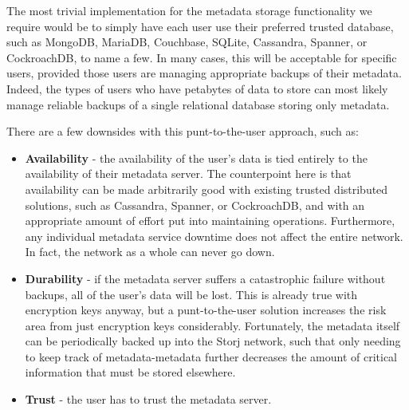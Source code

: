 \documentclass[11pt,fleqn,openany]{book}
\begin{document}
The most trivial implementation for the metadata storage functionality we
require would be to simply have each user use their preferred trusted database,
such as MongoDB, MariaDB, Couchbase, SQLite, Cassandra\cite{cassandra},
Spanner\cite{spanner}, or CockroachDB, to name a few. In many cases, this will
be acceptable for specific users, provided those users are managing appropriate
backups of their metadata. Indeed, the types of users who have petabytes of data
to store can most likely manage reliable backups of a single relational database
storing only metadata.

There are a few downsides with this punt-to-the-user approach, such as:
\begin{itemize}
\item {\bf Availability} - the availability of the user's data
is tied entirely to the availability of their metadata server. The counterpoint
here is that availability can be made arbitrarily good with existing trusted
distributed solutions, such as Cassandra, Spanner, or CockroachDB, and with an
appropriate amount of effort put into maintaining operations. Furthermore, any
individual metadata service downtime does not affect the entire network. In
fact, the network as a whole can never go down.
\item {\bf Durability} -
if the metadata server suffers a catastrophic failure without backups, all of
the user's data will be lost. This is already true with encryption keys anyway,
but a punt-to-the-user solution increases the risk area from just encryption
keys considerably. Fortunately, the metadata itself can be periodically backed
up into the Storj network,
such that only needing to keep track of metadata-metadata
further decreases the amount of critical information that must be stored
elsewhere.
\item {\bf Trust} - the user has to trust the metadata server.
\end{itemize}
\end{document}
